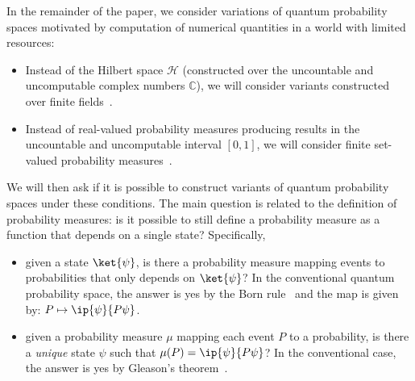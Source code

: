 \documentclass{article}
\theoremstyle{remark}
\newcommand{\Hilb}{\mathcal{H}}
\begin{document}
In the remainder of the paper, we consider variations of quantum
probability spaces motivated by computation of numerical quantities in
a world with limited resources:
\begin{itemize}
\item Instead of the Hilbert space $\Hilb$ (constructed over the uncountable
and uncomputable complex numbers $\mathbb{C}$), we will consider
variants constructed over finite fields~\cite{DQT2014,geometry2013}. 
\item Instead of real-valued probability measures producing results in
  the uncountable and uncomputable interval $[0,1]$, we will consider
  finite set-valued probability measures~\cite{PuriRalescu1983}.
\end{itemize}
We will then ask if it is possible to construct variants of quantum
probability spaces under these conditions. The main question is
related to the definition of probability measures: is it possible to
still define a probability measure as a function that depends on a
single state? Specifically,
\begin{itemize}
\item given a state $\ket{\psi}$, is there a probability measure
  mapping events to probabilities that only depends on $\ket{\psi}$?
  In the conventional quantum probability space, the answer is yes by
  the Born rule~\cite{Born1983,Mermin2007} and the map is given by:
  $P \mapsto \ip{\psi}{P\psi}$.
\item given a probability measure $\mu$
  mapping each event $P$
  to a probability, is there a \emph{unique} state $\psi$
  such that $\mu(P)
  =
  \ip{\psi}{P\psi}$? In the conventional case, the answer is yes by
  Gleason's
  theorem~\cite{gleason1957,peres1995quantum,Redhead1987-REDINA}.
\end{itemize}
\end{document}
